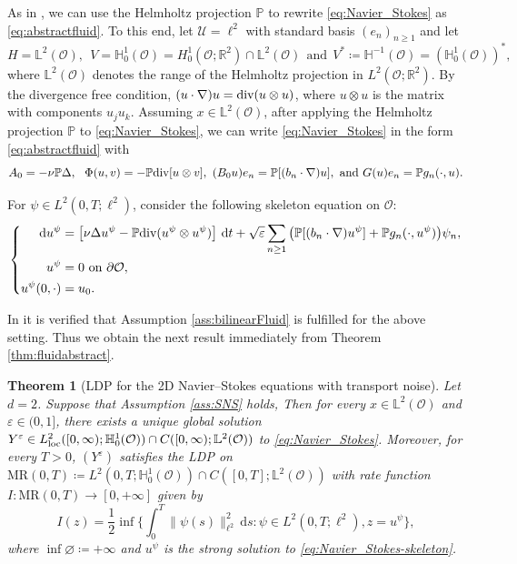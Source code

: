 \documentclass{amsart}
\renewcommand{\div}{\normalfont{\text{div}}}
\newcommand{\pr}{\mathbb{P}}
\newcommand{\Ls}{\mathbb{L}}
\newcommand{\Hs}{\mathbb{H}}
\newcommand{\Dom}{\mathcal{O}}
\newcommand{\dd}{\,\mathrm{d}}
\renewcommand{\MR}{\mathrm{MR}}
\newcommand{\<}{\langle}
\newcommand{\?}{\rangle}
\theoremstyle{plain}
\newtheorem{theorem}{Theorem}[section]
\theoremstyle{remark}
\theoremstyle{plain}
\numberwithin{equation}{section}
\def\R{{\mathbb R}}
\renewcommand{\P}{\mathbb{P}}
\newcommand{\eps}{\varepsilon}
\begin{document}
As in \cite[\S 7.3.4]{AVsurvey}, we can use the Helmholtz projection $\P$  to rewrite \eqref{eq:Navier_Stokes} as \eqref{eq:abstractfluid}. To this end, let $\mathcal{U} = \ell^2$ with standard basis $(e_n)_{n\geq 1}$ and let
\[
H = \Ls^2(\Dom), \ \  V = \Hs^1_0(\Dom) = H^1_0(\Dom;\R^2)\cap \Ls^2(\Dom)  \ \ \text{and} \ \   V^* \coloneqq \Hs^{-1}(\Dom) = (\Hs^1_0(\Dom))^*,
\]
where $\Ls^2(\Dom)$ denotes the range of the Helmholtz projection in $L^2(\Dom;\R^2)$. 
By the divergence free condition, $(u\cdot \nabla)u=\div(u\otimes u)$, where $u\otimes u$ is the matrix with components $u_{j} u_k$.
Assuming $x\in \Ls^2(\Dom)$, after applying the Helmholtz projection $\pr$ to \eqref{eq:Navier_Stokes}, we can write \eqref{eq:Navier_Stokes} in the form \eqref{eq:abstractfluid} with \[A_0 = -\nu \pr\Delta,\ \ \Phi(u,v) =- \pr\div[u\otimes v], \ (B_0 u)e_n = \pr[(b_{n}\cdot\nabla) u], \ \text{and} \  G(u) e_n = \pr g_n(\cdot, u).\]

For $\psi \in L^2(0,T;\ell^2)$, consider the following skeleton equation on $\Dom$: 
\begin{equation}
\label{eq:Navier_Stokes-skeleton}
\left\{
\begin{aligned}
\dd u^{\psi} &=\big[\nu \Delta u^{\psi} - \P\div(u^{\psi}\otimes u^{\psi})\big] \,\dd  t
+\sqrt{\varepsilon} \sum_{n\geq 1} \big(\P[(b_{n}\cdot\nabla) u^{\psi}] +\P g_n(\cdot,u^{\psi})\big)\psi_n,
\\ u^{\psi}&=0 \ \text{on $\partial \Dom$},
\\ u^{\psi}(0,\cdot)&=u_0.
\end{aligned}\right.
\end{equation}

In \cite[\S 7.3.4]{AVsurvey} it is verified that  Assumption \ref{ass:bilinearFluid} is fulfilled for the above setting. Thus we obtain the next result immediately from Theorem \ref{thm:fluidabstract}.

\begin{theorem}[LDP for the 2D Navier--Stokes equations with transport noise]\label{thm:SNS}
Let $d=2$. Suppose that Assumption \ref{ass:SNS} holds,
Then for every $x\in \Ls^2(\Dom)$ and $\varepsilon\in (0,1]$, there exists a unique global solution $Y^{\varepsilon}\in L^2_{\rm loc}([0,\infty);\Hs^1_0(\Dom))\cap C([0,\infty);\Ls^2(\Dom))$ to \eqref{eq:Navier_Stokes}. Moreover, for every $T>0$, $(Y^\eps)$ satisfies the LDP on $\MR(0,T)\coloneqq L^2(0,T;\Hs^1_0(\Dom))\cap C([0,T];\Ls^2(\Dom))$ with rate function $I\colon \MR(0,T)\to [0,+\infty]$ given by
\[
I(z)=\frac{1}{2}\inf\Big\{\int_0^T\|\psi(s)\|_{\ell^2}^2 \dd s : \psi\in L^2(0,T;\ell^2), z=u^{\psi}\Big\},
\]
where $\inf\varnothing\coloneqq +\infty$ and $u^\psi$ is the strong solution to \eqref{eq:Navier_Stokes-skeleton}.
\end{theorem}
\end{document}

